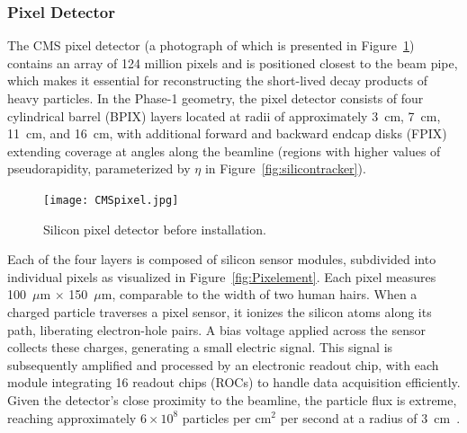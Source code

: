 
\subsubsection{Pixel Detector}

The CMS pixel detector (a photograph of which is presented in Figure~\ref{fig:CMSpixel}) contains an array of 124 million pixels and is positioned closest to the beam pipe, which makes it essential for reconstructing the short-lived decay products of heavy particles. In the Phase-1 geometry, the pixel detector consists of four cylindrical barrel (BPIX) layers located at radii of approximately 3~cm, 7~cm, 11~cm, and 16~cm, with additional forward and backward endcap disks (FPIX) extending coverage at angles along the beamline (regions with higher values of pseudorapidity, parameterized by $\eta$ in Figure~\ref{fig:silicontracker}).

\begin{figure}[!hbt]
    \begin{center}
        \texttt{[image: CMSpixel.jpg]}
        \caption{Silicon pixel detector before installation.}
        \label{fig:CMSpixel}
    \end{center}
\end{figure}

Each of the four layers is composed of silicon sensor modules, subdivided into individual pixels as visualized in Figure~\ref{fig:Pixelement}. Each pixel measures 100~$\mu$m $\times$ 150~$\mu$m, comparable to the width of two human hairs. When a charged particle traverses a pixel sensor, it ionizes the silicon atoms along its path, liberating electron-hole pairs. A bias voltage applied across the sensor collects these charges, generating a small electric signal. This signal is subsequently amplified and processed by an electronic readout chip, with each module integrating 16 readout chips (ROCs) to handle data acquisition efficiently. Given the detector’s close proximity to the beamline, the particle flux is extreme, reaching approximately $6 \times 10^8$ particles per cm$^2$ per second at a radius of 3~cm~\cite{The_CMS_Collaboration_2008}.

